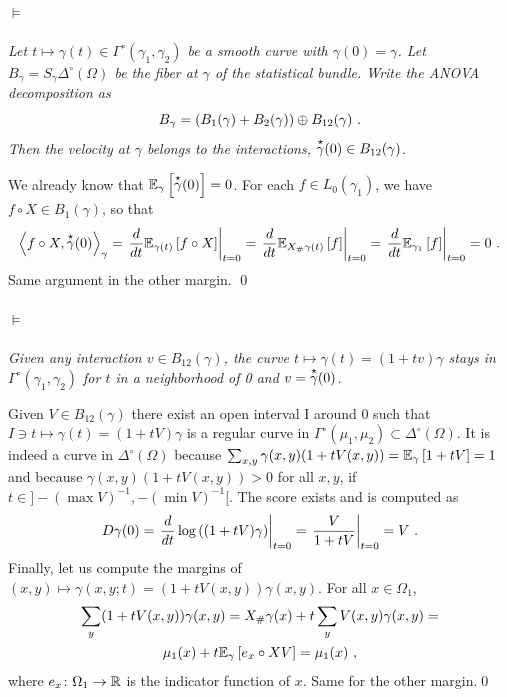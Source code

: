 \documentclass[runningheads]{llncs}
\begin{document}
\paragraph{$\bm\models$} \emph{Let $t \mapsto \gamma(t) \in \Gamma^\circ(\gamma_1,\gamma_2)$ be a smooth curve with $\gamma(0)=\gamma$. Let $B_\gamma = S_\gamma \Delta^\circ(\Omega)$ be the fiber at $\gamma$ of the statistical bundle. Write the ANOVA decomposition as
  \begin{equation*}
    B_{\gamma} = (B_1(\gamma) + B_2(\gamma)) \oplus B_{12}(\gamma) \ .
  \end{equation*}
  Then the velocity at $\gamma$ belongs to the interactions, $\overset{\star}{\gamma}(0) \in B_{12}(\gamma)$.}


We already know that ${\operatorname{\mathbb E}}_{\gamma}\left[\overset{\star}{\gamma}(0)\right] = 0$. For each $f \in L_0(\gamma_1)$, we have $f \circ X \in B_1(\gamma)$, so that 
%
    \begin{equation*}
    \left\langle f \circ X , \overset{\star}{\gamma}(0) \right\rangle_{\gamma} = \left. \frac{d}{dt} {\operatorname{\mathbb E}}_{\gamma(t)}\left[f \circ X\right] \right|_{t=0} = \left. \frac{d}{dt} {\operatorname{\mathbb E}}_{X_{\#}\gamma(t)}\left[f\right] \right|_{t=0} = \left. \frac{d}{dt} {\operatorname{\mathbb E}}_{\gamma_1}\left[f\right] \right|_{t=0} = 0 \ .
    \end{equation*}
%
Same argument in the other margin. \qed

\paragraph{$\bm\models$} \emph{Given any interaction $v \in B_{12}(\gamma)$, the curve $t \mapsto \gamma(t) = (1+tv)\gamma$ stays in $\Gamma^\circ(\gamma_1,\gamma_2)$ for $t$ in a neighborhood of 0 and $v = \overset{\star}{\gamma}(0)$.} 

Given $V \in B_{12}(\gamma)$ there exist an open interval I around 0 such that $I \ni t \mapsto \gamma(t) = (1+tV)\gamma$ is a regular curve in $\Gamma^\circ(\mu_1,\mu_2) \subset \Delta^\circ(\Omega)$. It is indeed a curve in $\Delta^\circ(\Omega)$ because $\sum_{x,y} \gamma(x,y)(1+tV(x,y)) = {\operatorname{\mathbb E}}_{\gamma}\left[1+tV\right] = 1$ and because $\gamma(x,y)(1+tV(x,y)) > 0$ for all $x,y$, if $t \in ]- (\max V)^{-1}, - (\min V)^{-1}[$.  The score exists and is computed as
%
\    \begin{equation*}
     D\gamma(0) = \left.  \frac{d}{dt} \log\left( (1+tV)\gamma \right) \right|_{t=0} = \left. \frac V {1+tV} \right|_{t=0} = V \ .
    \end{equation*}
%
Finally, let us compute the margins of $(x,y) \mapsto \gamma(x,y;t) = (1+tV(x,y))\gamma(x,y)$. For all $x \in \Omega_1$,
%
\begin{multline*}
  \sum_y (1+tV(x,y))\gamma(x,y) = X_\# \gamma(x) + t \sum_y V(x,y)\gamma(x,y) = \\ \mu_1(x) + t {\operatorname{\mathbb E}}_{\gamma}\left[e_x\circ X V\right] = \mu_1(x) \ ,
\end{multline*}
%
where $e_x \colon \Omega_1 \to \mathbb R$ is the indicator function of $x$. Same for the other margin.\qed
\end{document}
